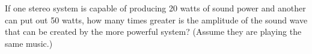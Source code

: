 If one stereo system is capable of producing 20 watts of
sound power and another can put out 50 watts, how many times
greater is the amplitude of the sound wave that can be
created by the more powerful system? (Assume they are
playing the same music.)
